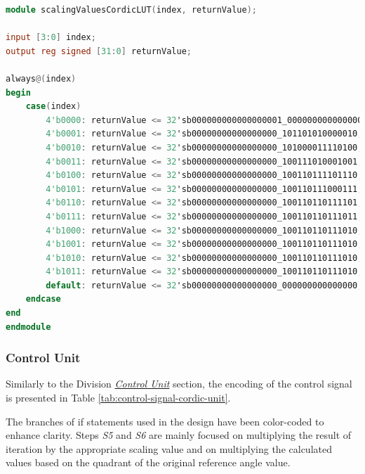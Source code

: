 \documentclass[a4paper, twoside, 11pt]{article}
\newcommand{\fbar}{\FloatBarrier}
\begin{document}
            \begin{lstlisting}[language={verilog}, caption={Verilog code of the scalingValuesCordicLUT lookup table (\gls{abbreviation:lut}) implementation.}, label= {lst:scalingValuesCordicLUT}]
module scalingValuesCordicLUT(index, returnValue);

input [3:0] index;
output reg signed [31:0] returnValue;

always@(index)
begin
    case(index)
        4'b0000: returnValue <= 32'sb000000000000000001_000000000000000; // 1
        4'b0001: returnValue <= 32'sb00000000000000000_101101010000010; // 0.7071067811865476
        4'b0010: returnValue <= 32'sb00000000000000000_101000011110100; // 0.6324555320336759
        4'b0011: returnValue <= 32'sb00000000000000000_100111010001001; // 0.6135719910778964
        4'b0100: returnValue <= 32'sb00000000000000000_100110111101110; // 0.6088339125177524
        4'b0101: returnValue <= 32'sb00000000000000000_100110111000111; // 0.6088339125177524
        4'b0110: returnValue <= 32'sb00000000000000000_100110110111101; // 0.607351770141296
        4'b0111: returnValue <= 32'sb00000000000000000_100110110111011; // 0.6072776440935261
        4'b1000: returnValue <= 32'sb00000000000000000_100110110111010; // 0.6072591122988928
        4'b1001: returnValue <= 32'sb00000000000000000_100110110111010; // 0.6072544793325625
        4'b1010: returnValue <= 32'sb00000000000000000_100110110111010; // 0.6072533210898753
        4'b1011: returnValue <= 32'sb00000000000000000_100110110111010; // 0.6072530315291345
        default: returnValue <= 32'sb00000000000000000_000000000000000; // 0
    endcase
end
endmodule\end{lstlisting}
        \fbar
        \subsubsection{Control Unit}\label{subsubsec:cordic-control-unit}
        Similarly to the Division \hyperref[subsubsec:division-control-unit]{\textit{Control Unit}} section, the encoding of the control signal is presented in Table \ref{tab:control-signal-cordic-unit}.\par
        The branches of if statements used in the design have been color-coded to enhance clarity. Steps \textit{S5} and \textit{S6} are mainly focused on multiplying the result of iteration by the appropriate scaling value and on multiplying the calculated values based on the quadrant of the original reference angle value.
        
\end{document}
